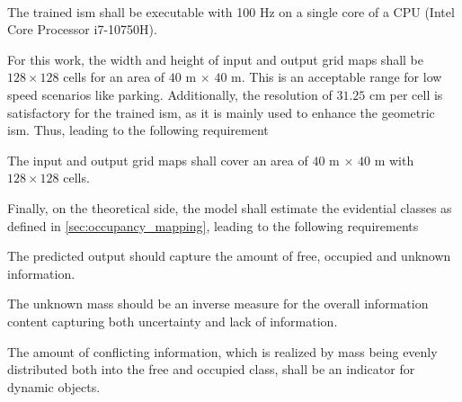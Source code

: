 \\
\begin{subreq} \label{subreq:resource_efficient_inference}
	The trained \gls{ism} shall be executable with 100 Hz on a single core of a CPU (Intel Core Processor i7-10750H).
\end{subreq}
For this work, the width and height of input and output grid maps shall be $128 \times 128$ cells for an area of $40$ m $\times$ $40$ m. This is an acceptable range for low speed scenarios like parking. Additionally, the resolution of $31.25$ cm per cell is satisfactory for the trained \gls{ism}, as it is mainly used to enhance the geometric \gls{ism}. Thus, leading to the following requirement
\\
\begin{subreq} \label{subreq:grid_map_size}
	The input and output grid maps shall cover an area of $40$ m $\times$ $40$ m with $128 \times 128$ cells.
\end{subreq}
Finally, on the theoretical side, the model shall estimate the evidential classes as defined in \ref{sec:occupancy_mapping}, leading to the following requirements
\\
\begin{subreq} \label{subreq:ev_rep}
	The predicted output should capture the amount of free, occupied and unknown information.
\end{subreq}
\begin{subreq} \label{subreq:unknown_mass}
	The unknown mass should be an inverse measure for the overall information content capturing both uncertainty and lack of information.
\end{subreq}
\begin{subreq} \label{subreq:conflicting_mass}
	The amount of conflicting information, which is realized by mass being evenly distributed both into the free and occupied class, shall be an indicator for dynamic objects.
\end{subreq}

%
